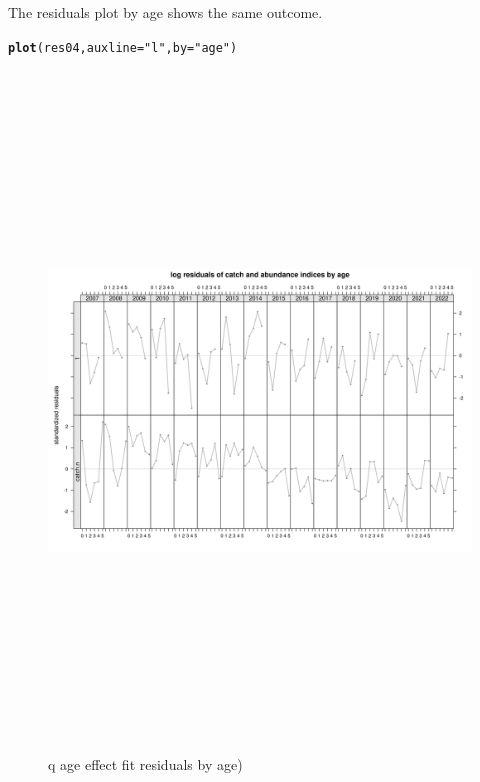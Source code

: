 \documentclass[a4paper,english,11pt]{article}\usepackage[]{graphicx}\usepackage[]{xcolor}
\makeatletter
\newcommand{\hlsng}[1]{\textcolor[rgb]{0.192,0.494,0.8}{#1}}%
\newcommand{\hldef}[1]{\textcolor[rgb]{0.345,0.345,0.345}{#1}}%
\newcommand{\hlkwc}[1]{\textcolor[rgb]{0.333,0.667,0.333}{#1}}%
\newcommand{\hlkwd}[1]{\textcolor[rgb]{0.737,0.353,0.396}{\textbf{#1}}}%
\newenvironment{kframe}{%
 \def\at@end@of@kframe{}%
 \ifinner\ifhmode%
  \def\at@end@of@kframe{\end{minipage}}%
  \begin{minipage}{\columnwidth}%
 \fi\fi%
 \def\FrameCommand##1{\hskip\@totalleftmargin \hskip-\fboxsep
 \colorbox{shadecolor}{##1}\hskip-\fboxsep
     \hskip-\linewidth \hskip-\@totalleftmargin \hskip\columnwidth}%
 \MakeFramed {\advance\hsize-\width
   \@totalleftmargin\z@ \linewidth\hsize
   \@setminipage}}%
 {\par\unskip\endMakeFramed%
 \at@end@of@kframe}
\newenvironment{knitrout}{}{} %
\makeatother
\begin{document}
The residuals plot by age shows the same outcome.  

\begin{knitrout}
\color{fgcolor}\begin{kframe}
\begin{alltt}
\hlkwd{plot}\hldef{(res04,} \hlkwc{auxline} \hldef{=} \hlsng{"l"}\hldef{,} \hlkwc{by} \hldef{=} \hlsng{"age"}\hldef{)}
\end{alltt}
\end{kframe}\begin{figure}[H]

{\centering \includegraphics[width=25cm,height=18cm,angle=90]{figure/fqageresbyage-1} 

}

\caption[q age effect fit residuals by age)]{q age effect fit residuals by age)}\label{fig:fqageresbyage}
\end{figure}

\end{knitrout}
\end{document}
